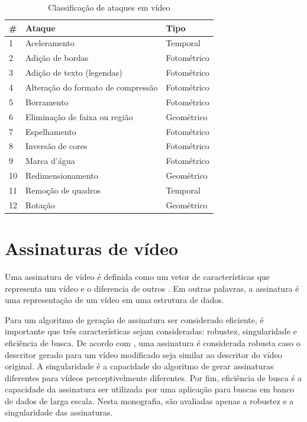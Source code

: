 \begin{table}[!ht]
\centering
\caption{Classificação de ataques em vídeo}
\label{tab-classificacao-ataques}
\begin{tabular}{|l|l|l|}
\hline
\# & \textbf{Ataque}                    & \textbf{Tipo} \\ \hline
1           & Aceleramento                       & Temporal      \\ \hline
2           & Adição de bordas                   & Fotométrico   \\ \hline
3           & Adição de texto (legendas)         & Fotométrico   \\ \hline
4           & Alteração do formato de compressão & Fotométrico   \\ \hline
5           & Borramento                         & Fotométrico   \\ \hline
6           & Eliminação de faixa ou região      & Geométrico    \\ \hline
7           & Espelhamento                       & Fotométrico   \\ \hline
8           & Inversão de cores                  & Fotométrico   \\ \hline
9           & Marca d'água                       & Fotométrico   \\ \hline
10          & Redimensionamento                  & Geométrico    \\ \hline
11          & Remoção de quadros                 & Temporal      \\ \hline
12          & Rotação                            & Geométrico    \\ \hline
\end{tabular}
\end{table}





\section{Assinaturas de vídeo}
\label{sec:assinatura} 
    
	Uma assinatura de vídeo é definida como um vetor de características que representa um vídeo e o diferencia de outros \citeauthor{lee2008robust}. Em outras palavras, a assinatura é uma representação de um vídeo em uma estrutura de dados. 
        
	Para um algoritmo de geração de assinatura ser considerado eficiente, é importante que três características sejam consideradas: robustez, singularidade e eficiência de busca. De acordo com \citeauthor{lee2008robust}, uma assinatura é considerada robusta caso o descritor gerado para um vídeo modificado seja similar ao descritor do vídeo original. A singularidade é a capacidade do algoritmo de gerar assinaturas diferentes para vídeos perceptivelmente diferentes. Por fim, eficiência de busca é a capacidade da assinatura  ser utilizada por uma aplicação para buscas em banco de dados de larga escala. Nesta monografia, são avaliadas apenas a robustez e a singularidade das assinaturas.   
    
